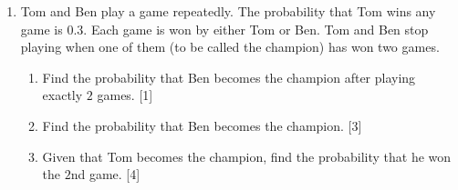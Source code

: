 \begin{enumerate}
\item Tom and Ben play a game repeatedly. The probability that Tom wins any game is $0.3$. Each game is
won by either Tom or Ben. Tom and Ben stop playing when one of them (to be called the champion)
has won two games.

\begin{enumerate}[label=(\roman*)]
	\item Find the probability that Ben becomes the champion after playing exactly $2$ games. \hfill [1]
	
	\item Find the probability that Ben becomes the champion.  \hfill[3]
	\item Given that Tom becomes the champion, find the probability that he won the $2$nd game. \hfill[4]
\end{enumerate}



	
\end{enumerate}

	

	
	
	
	
	



